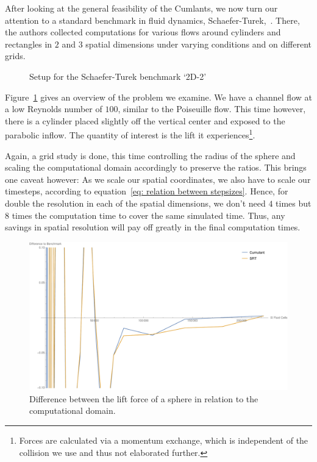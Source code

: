 After looking at the general feasibility of the Cumlants, we now turn our attention to a standard benchmark in fluid dynamics, Schaefer-Turek,~\cite{schafer1996benchmark}.
There, the authors collected computations for various flows around cylinders and rectangles in $2$ and $3$ spatial dimensions under varying conditions and on different grids.

\begin{figure}
  \centering
  
  \caption{Setup for the Schaefer-Turek benchmark `2D-2'}
\label{fig: schaeferTurek}
\end{figure}

Figure~\ref{fig: schaeferTurek} gives an overview of the problem we examine.
We have a channel flow at a low Reynolds number of $100$, similar to the Poiseuille flow.
This time however, there is a cylinder placed slightly off the vertical center and exposed to the parabolic inflow.
The quantity of interest is the lift it experiences\footnote{Forces are calculated via a momentum exchange, which is independent of the collision we use and thus not elaborated further.}.

Again, a grid study is done, this time controlling the radius of the sphere and scaling the computational domain accordingly to preserve the ratios.
This brings one caveat however:
As we scale our spatial coordinates, we also have to scale our timesteps, according to equation~\eqref{eq: relation between stepsizes}.
Hence, for double the resolution in each of the spatial dimensions, we don't need $4$ times but $8$ times the computation time to cover the same simulated time.
Thus, any savings in spatial resolution will pay off greatly in the final computation times.


\begin{figure}
  \centering
  \includegraphics[width=\linewidth]{../figures/schaeferTurekLift_nrFluidVsDiff.pdf} %
  \caption{Difference between the lift force of a sphere in relation to the computational domain.}
\label{fig: schaefer turek nrFluidVsDiff}
\end{figure}

